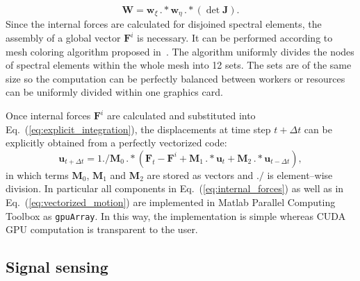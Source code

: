\documentclass[preprint,12pt]{elsarticle}
\renewcommand{\vec}[1]{\mathbf{#1}}
\begin{document}
	\begin{equation}
	\vec{W} = \vec{w}_{\xi}\,.*\vec{w}_{\eta}\,.*\left(\det\vec{J}\right).
	\end{equation}
	Since the internal forces are calculated for disjoined spectral elements, the assembly of a global vector $\vec{F}^i$ is necessary. It can be performed according to mesh coloring algorithm proposed in~\cite{Kudela2016}. The algorithm uniformly divides the nodes of spectral elements within the whole mesh into 12 sets. The sets are of the same size so the computation can be perfectly balanced between workers or resources can be uniformly divided within one graphics card.
	
	Once internal forces $\vec{F}^i$ are calculated and substituted into Eq.~(\ref{eq:explicit_integration}), the displacements at time step $t+\Delta t$ can be explicitly obtained from a perfectly vectorized code:
	\begin{equation}
	\vec{u}_{t+\Delta t}=1./\vec{M}_0\, .*\left(\vec{F}_t - \vec{F}^i +\vec{M}_1 \, .* \vec{u}_t +\vec{M}_2 \, .* \vec{u}_{t-\Delta t}\right),
	\label{eq:vectorized_motion}
	\end{equation} 
	in which terms $\vec{M}_0$, $\vec{M}_1$ and $\vec{M}_2$ are stored as vectors and $./$ is element--wise division. In particular all components in Eq.~(\ref{eq:internal_forces}) as well as in Eq.~(\ref{eq:vectorized_motion}) are implemented in Matlab Parallel Computing Toolbox as \verb|gpuArray|. In this way, the implementation is simple whereas CUDA GPU computation is transparent to the user. 
	
	\subsection{Signal sensing}
	
\end{document}
